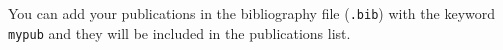 \setlength{\parskip}{\baselineskip}

You can add your publications in the bibliography file (\texttt{.bib}) with the keyword \texttt{mypub} and they will be included in the publications list.

\begin{refsection}
\nocite{*}
\printbibliography[env=mypub, heading=none, resetnumbers=true, keyword=mypub]
\end{refsection}
